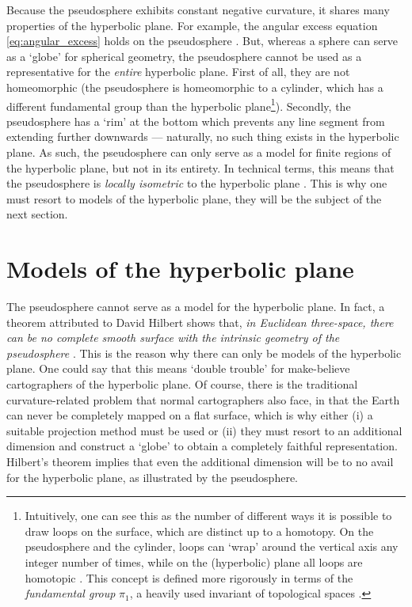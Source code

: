 Because the pseudosphere exhibits constant negative curvature, it shares many properties of the hyperbolic plane. For example, the angular excess equation \cref{eq:angular_excess} holds on the pseudosphere \cite{Needham1997}. But, whereas a sphere can serve as a `globe' for spherical geometry, the pseudosphere cannot be used as a representative for the \emph{entire} hyperbolic plane. First of all, they are not homeomorphic (the pseudosphere is homeomorphic to a cylinder, which has a different fundamental group than the hyperbolic plane\footnote{Intuitively, one can see this as the number of different ways it is possible to draw loops on the surface, which are distinct up to a homotopy. On the pseudosphere and the cylinder, loops can `wrap' around the vertical axis any integer number of times, while on the (hyperbolic) plane all loops are homotopic \cite{Lee2000}. This concept is defined more rigorously in terms of the \emph{fundamental group} \(\pi_1\), a heavily used invariant of topological spaces \cite{Schuller2014}.}). Secondly, the pseudosphere has a `rim' at the bottom which prevents any line segment from extending further downwards --- naturally, no such thing exists in the hyperbolic plane. As such, the pseudosphere can only serve as a model for finite regions of the hyperbolic plane, but not in its entirety. In technical terms, this means that the pseudosphere is \emph{locally isometric} to the hyperbolic plane \cite{Ghys2010}. This is why one must resort to models of the hyperbolic plane, they will be the subject of the next section.

\section{Models of the hyperbolic plane}
\label{sec:hyperbolic_models}
The pseudosphere cannot serve as a model for the hyperbolic plane. In fact, a theorem attributed to David Hilbert shows that, \emph{in Euclidean three-space, there can be no complete smooth surface with the intrinsic geometry of the pseudosphere} \cite{Thurston1997}. This is the reason why there can only be models of the hyperbolic plane. One could say that this means `double trouble' for make-believe cartographers of the hyperbolic plane. Of course, there is the traditional curvature-related problem that normal cartographers also face, in that the Earth can never be completely mapped on a flat surface, which is why either (i) a suitable projection method must be used or (ii) they must resort to an additional dimension and construct a `globe' to obtain a completely faithful representation. Hilbert's theorem implies that even the additional dimension will be to no avail for the hyperbolic plane, as illustrated by the pseudosphere.

